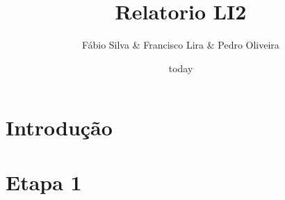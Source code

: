 \documentclass[a4paper]{article}
\title{Relatorio LI2}
\author{Fábio Silva & Francisco Lira & Pedro Oliveira}
\date{today}
\begin{document}
\maketitle
\tableofcontents
\section{Introdução}

\section{Etapa 1}
\end{document}

